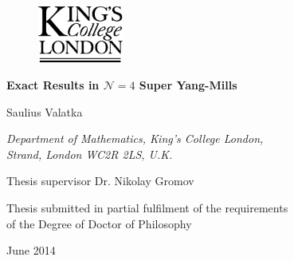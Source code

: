 \documentclass[a4paper]{article}
\newcommand{\N}{\mathcal{N}}
\numberwithin{equation}{section}
\begin{document}
\begin{titlepage}

\thispagestyle{empty}

\begin{center}

\begin{figure}[t]
	\centering
	\includegraphics[width=0.25\textwidth]{../graphics/kcl_logo}
\end{figure}

\vspace*{50pt}

\LARGE
\textbf{Exact Results in $\N=4$ Super Yang-Mills}

\vspace{40pt}

\Large
Saulius Valatka

\vspace{30pt}

\small
\it{Department of Mathematics, King's College London, \\
Strand, London WC2R 2LS, U.K.}

\vspace{230pt}

\Large\rm
Thesis supervisor Dr. Nikolay Gromov

\vspace{30pt}

\small
Thesis submitted in partial fulfilment of the requirements \\
of the Degree of Doctor of Philosophy

\vspace{40pt}

\large
June 2014

\end{center}

\end{titlepage}


\pagestyle{fancy}





\newpage 

%


\tableofcontents
\end{document}
